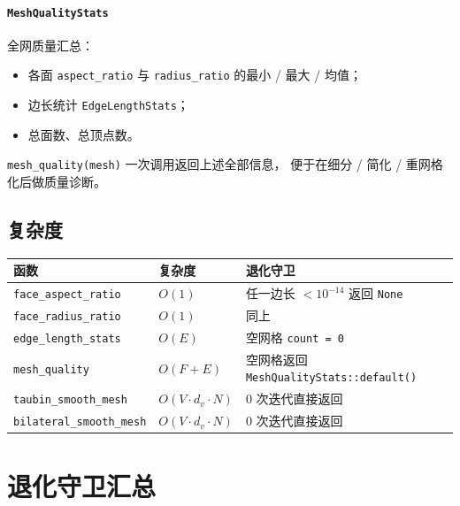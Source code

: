 \documentclass[11pt,a4paper]{article}
\begin{document}
\paragraph{\texttt{MeshQualityStats}} 全网质量汇总：
\begin{itemize}
  \item 各面 \texttt{aspect\_ratio} 与 \texttt{radius\_ratio} 的最小 / 最大 / 均值；
  \item 边长统计 \texttt{EdgeLengthStats}；
  \item 总面数、总顶点数。
\end{itemize}
\texttt{mesh\_quality(mesh)} 一次调用返回上述全部信息，
便于在细分 / 简化 / 重网格化后做质量诊断。

\subsection{复杂度}

\begin{center}
\renewcommand{\arraystretch}{1.18}
\begin{tabular}{@{}lll@{}}
  \toprule
  \textbf{函数} & \textbf{复杂度} & \textbf{退化守卫} \\
  \midrule
  \texttt{face\_aspect\_ratio}    & $O(1)$ & 任一边长 $< 10^{-14}$ 返回 \texttt{None} \\
  \texttt{face\_radius\_ratio}    & $O(1)$ & 同上 \\
  \texttt{edge\_length\_stats}    & $O(E)$ & 空网格 \texttt{count = 0} \\
  \texttt{mesh\_quality}          & $O(F + E)$ & 空网格返回 \texttt{MeshQualityStats::default()} \\
  \texttt{taubin\_smooth\_mesh}   & $O(V \cdot d_v \cdot N)$ & 0 次迭代直接返回 \\
  \texttt{bilateral\_smooth\_mesh}& $O(V \cdot d_v \cdot N)$ & 0 次迭代直接返回 \\
  \bottomrule
\end{tabular}
\end{center}

\section{退化守卫汇总}
\end{document}
